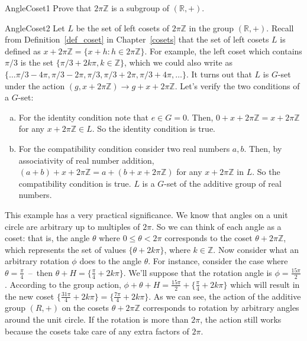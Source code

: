 \begin{exercise}{AngleCoset1}
Prove that $2 \pi \mathbb{Z}$ is a subgroup of $(\mathbb{R},+)$.
\end{exercise}
\begin{example}{AngleCoset2}
Let $L$ be the set of left cosets of $2\pi \mathbb{Z}$ in the group $(\mathbb{R},+)$.  Recall from Definition~\ref{def_coset} in Chapter~\ref{cosets} that the set of left cosets $L$ is defined as $x+2\pi \mathbb{Z}=\{x+h:h\in 2\pi\mathbb{Z}\}$.  For example, the left coset which contains $\pi/3$ is the set $ \{\pi/3 +2k\pi, k\in \mathbb{Z}\}$, which we could also write as $\{ \ldots \pi/3-4\pi, \pi/3-2\pi, \pi/3, \pi/3+2\pi, \pi/3 + 4\pi, \ldots \}$.  It turns out that $L$ is $G$-set under the action  
$(g,x+2\pi\mathbb{Z}) \rightarrow g+x+2\pi\mathbb{Z}$. Let's verify the two conditions of a $G$-set:
\begin{enumerate}[(a)]
\item
For the identity condition note that $e\in G=0$. Then, $0+x+2\pi\mathbb{Z}=x+2\pi\mathbb{Z}$ for any $x+2\pi\mathbb{Z}\in L$.  So the identity condition is true.
\item 
For the compatibility condition consider two real numbers $a,b$.  Then, by associativity of real number addition, $(a+b)+x+2\pi\mathbb{Z}=a+(b+x+2\pi\mathbb{Z})$ for any $x+2\pi\mathbb{Z}$  in $L$.  So the compatibility condition is true.  $L$ is a $G$-set of the additive group of real numbers.
\end {enumerate}
This example has a very practical significance. We know that angles on a unit circle are arbitrary up to multiples of $2\pi$. So we can think of each angle as a coset:  that is, the angle $\theta$ where $0\leq\theta<2\pi$ corresponds to  the coset $\theta + 2\pi \mathbb{Z}$, which represents the set of values $\{\theta +2k\pi\}$, where $k \in \mathbb{Z}$. Now consider what an arbitrary rotation $\phi$ does to the angle $\theta$. For instance, consider the case where $\theta=\frac{\pi}{4}$~--~then $\theta+H=\{ \frac{\pi}{4}+2k\pi\}$.  We'll suppose that the rotation angle is $\phi=\frac{15\pi}{2}$.  According to the group action, $\phi+\theta+H =\frac{15\pi}{2}+\{\frac{\pi}{4}+2k\pi\}$ which will result in the new coset $\{\frac{31\pi}{4}+2k\pi\}=\{\frac{7\pi}{4}+2k\pi\}$.
As we can see, the action of the additive group $(R,+)$ on the cosets $\theta + 2\pi \mathbb{Z}$ corresponds to rotation by arbitrary angles around the unit circle. If the rotation is more than $2 \pi$, the action still works because the cosets take care of any extra factors of $2 \pi$.
\end {example}

